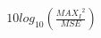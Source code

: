 \documentclass[preview]{standalone}
\begin{document}
\begin{align*}
10log_{10}\left(\frac{{MAX_I}^2}{MSE}\right)
\end{align*}
\end{document}
